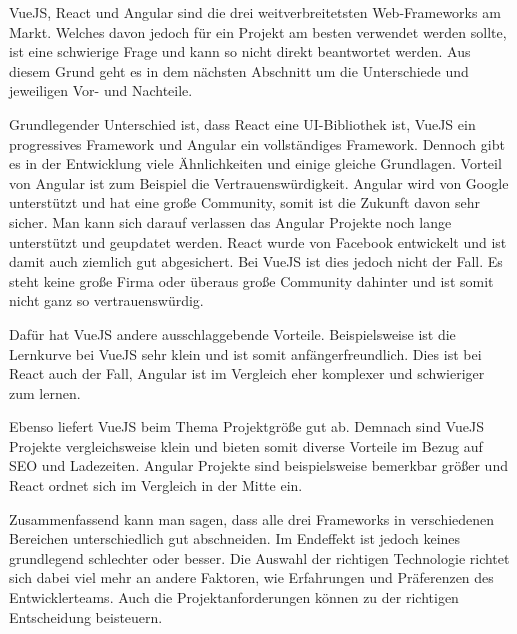 VueJS, React und Angular sind die drei weitverbreitetsten Web-Frameworks am Markt. Welches davon jedoch für ein Projekt am besten verwendet werden sollte, ist eine schwierige Frage und kann so nicht direkt beantwortet werden. Aus diesem Grund geht es in dem nächsten Abschnitt um die Unterschiede und jeweiligen Vor- und Nachteile.

Grundlegender Unterschied ist, dass React eine UI-Bibliothek ist, VueJS ein progressives Framework und Angular ein vollständiges Framework. Dennoch gibt es in der Entwicklung viele Ähnlichkeiten und einige gleiche Grundlagen.
Vorteil von Angular ist zum Beispiel die Vertrauenswürdigkeit. Angular wird von Google unterstützt und hat eine große Community, somit ist die Zukunft davon sehr sicher. Man kann sich darauf verlassen das Angular Projekte noch lange unterstützt und geupdatet werden. React wurde von Facebook entwickelt und ist damit auch ziemlich gut abgesichert. Bei VueJS ist dies jedoch nicht der Fall. Es steht keine große Firma oder überaus große Community dahinter und ist somit nicht ganz so vertrauenswürdig.

Dafür hat VueJS andere ausschlaggebende Vorteile. Beispielsweise ist die Lernkurve bei VueJS sehr klein und ist somit anfängerfreundlich. Dies ist bei React auch der Fall, Angular ist im Vergleich eher komplexer und schwieriger zum lernen.

Ebenso liefert VueJS beim Thema Projektgröße gut ab. Demnach sind VueJS Projekte vergleichsweise klein und bieten somit diverse Vorteile im Bezug auf SEO und Ladezeiten. Angular Projekte sind beispielsweise bemerkbar größer und React ordnet sich im Vergleich in der Mitte ein.

Zusammenfassend kann man sagen, dass alle drei Frameworks in verschiedenen Bereichen unterschiedlich gut abschneiden. Im Endeffekt ist jedoch keines grundlegend schlechter oder besser. Die Auswahl der richtigen Technologie richtet sich dabei viel mehr an andere Faktoren, wie Erfahrungen und Präferenzen des Entwicklerteams. Auch die Projektanforderungen können zu der richtigen Entscheidung beisteuern.
\cite{frontend_web_comparison}